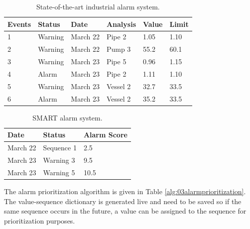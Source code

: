 \begin{table}[H]
	\centering
	\begin{tabular}{P{1.1cm}|P{2.1cm}|P{2.1cm}|P{2.1cm}|P{2cm}|P{2cm}}
	Events & Status & Date & Analysis & Value & Limit \\  & Warning & March 22 & Pipe 2 & 1.05 & 1.10 \\
	2 & Warning & March 22 & Pump 3 & 55.2 & 60.1 \\
	3 & Warning & March 23 & Pipe 5 & 0.96 & 1.15 \\
	4 & Alarm & March 23 & Pipe 2 & 1.11 & 1.10 \\
	5 & Warning & March 23 & Vessel 2 & 32.7 & 33.5 \\ 
	6 & Alarm & March 23 & Vessel 2 & 35.2 & 33.5 \\
	\end{tabular}
	\caption{State-of-the-art industrial alarm system.}
	\label{alg:03norm_system}
\end{table}

\begin{table} [H]
	\centering
	\begin{tabular}{P{3cm}|P{3cm}|P{3cm}}
	Date & Status & Alarm Score\\ \hline
	March 22 & Sequence 1 & 2.5\\
	March 23 & Warning 3 & 9.5  \\
	March 23 & Warning 5 & 10.5 \\
	\end{tabular}
	\caption{SMART alarm system.}
	\label{alg:03SMARTalarm}
\end{table}

The alarm prioritization algorithm is given in Table \ref{alg:03alarmprioritization}.  The value-sequence dictionary is generated live and need to be saved so if the same sequence occurs in the future, a value can be assigned to the sequence for prioritization purposes.

